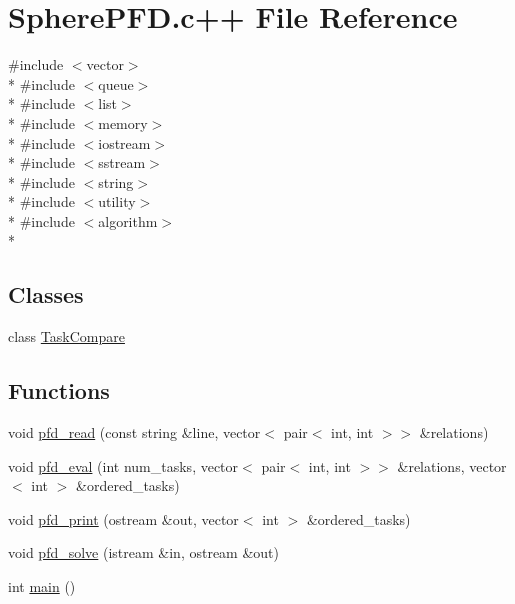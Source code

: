 \hypertarget{SpherePFD_8c_09_09}{\section{Sphere\-P\-F\-D.\-c++ File Reference}
\label{SpherePFD_8c_09_09}
}
{\ttfamily \#include $<$vector$>$}\\*
{\ttfamily \#include $<$queue$>$}\\*
{\ttfamily \#include $<$list$>$}\\*
{\ttfamily \#include $<$memory$>$}\\*
{\ttfamily \#include $<$iostream$>$}\\*
{\ttfamily \#include $<$sstream$>$}\\*
{\ttfamily \#include $<$string$>$}\\*
{\ttfamily \#include $<$utility$>$}\\*
{\ttfamily \#include $<$algorithm$>$}\\*
\subsection*{Classes}
\begin{DoxyCompactItemize}
\item 
class \hyperlink{classTaskCompare}{Task\-Compare}
\end{DoxyCompactItemize}
\subsection*{Functions}
\begin{DoxyCompactItemize}
\item 
void \hyperlink{SpherePFD_8c_09_09_aed19543fa1f0fa11289ecbba54a43334}{pfd\-\_\-read} (const string \&line, vector$<$ pair$<$ int, int $>$$>$ \&relations)
\item 
void \hyperlink{SpherePFD_8c_09_09_a6ad321f0cdec4aa4f1bda91174b3b6ea}{pfd\-\_\-eval} (int num\-\_\-tasks, vector$<$ pair$<$ int, int $>$$>$ \&relations, vector$<$ int $>$ \&ordered\-\_\-tasks)
\item 
void \hyperlink{SpherePFD_8c_09_09_a0d446917c4046f40c8cdcbf6f712312b}{pfd\-\_\-print} (ostream \&out, vector$<$ int $>$ \&ordered\-\_\-tasks)
\item 
void \hyperlink{SpherePFD_8c_09_09_a6584b134df3d4e68732be7089136c17e}{pfd\-\_\-solve} (istream \&in, ostream \&out)
\item 
int \hyperlink{SpherePFD_8c_09_09_ae66f6b31b5ad750f1fe042a706a4e3d4}{main} ()
\end{DoxyCompactItemize}


